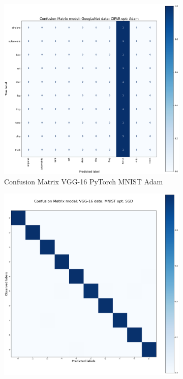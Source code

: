\documentclass[conference]{IEEEtran}
\begin{document}
\begin{figure}[!htbp]
    \centering
    \begin{subfigure}[b]{0.22\textwidth}
        \centering
        \includegraphics[width=\textwidth]{img/matrix_sample.png}
        \caption{Confusion Matrix VGG-16 PyTorch MNIST Adam}
        \label{fig:x imatrix_GG-16_PyTorch_MNIST_Adam}
    \end{subfigure}
    \hfill
    \begin{subfigure}[b]{0.21\textwidth}
        \centering
        \includegraphics[width=\textwidth]{img/matrix_vgg_torch_MNIST_SGD.png}

\end{subfigure}
\end{figure}
\end{document}
